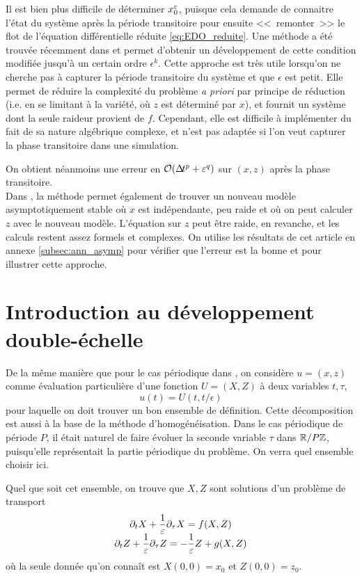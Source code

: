 Il est bien plus difficile de déterminer $x_0^{\varepsilon}$, puisque cela demande de connaitre l'état du système après la période transitoire pour ensuite <<~remonter~>> le flot de l'équation différentielle réduite \eqref{eq:EDO_reduite}. 
Une méthode a été trouvée récemment dans \cite{castella2016formal} et permet d'obtenir un développement de cette condition modifiée jusqu'à un certain ordre $\epsilon^k$. 
Cette approche est très utile lorsqu'on ne cherche pas à capturer la période transitoire du système et que $\epsilon$ est petit. Elle permet de réduire la complexité du problème \textit{a priori} par principe de réduction (i.e. en se limitant à la variété, où $z$ est déterminé par $x$), et fournit un système dont la seule raideur provient de $f$. Cependant, elle est difficile à implémenter du fait de sa nature algébrique complexe, et n'est pas adaptée si l'on veut capturer la phase transitoire dans une simulation. 

On obtient néanmoins une erreur en $\mathcal{O}(\Delta\!\!\!\ t^p + \varepsilon^q)$ sur $(x,z)$ après la phase transitoire. \\

Dans \cite{castella2016formal}, la méthode permet également de trouver un nouveau modèle asymptotiquement stable où $x$ est indépendante, peu raide et où on peut calculer $z$ avec le nouveau modèle. 
L'équation sur $z$ peut être raide, en revanche, et les calculs restent assez formels et complexes.
On utilise les résultats de cet article en annexe \ref{subsec:ann_asymp} pour vérifier que l'erreur est la bonne et pour illustrer cette approche. 



\section{Introduction au développement double-échelle}


De la même manière que pour le cas périodique dans \cite{chartier2015UA}, on considère $u = (x,z)$ comme évaluation particulière d'une fonction $U = (X,Z)$ à deux variables $t,\tau$, 
$$ u(t) = U(t,t/\epsilon) $$
pour laquelle on doit trouver un bon ensemble de définition. 
Cette décomposition est aussi à la base de la méthode d'homogénéisation. 
Dans le cas périodique de période $P$, il était naturel de faire évoluer la seconde variable $\tau$ dans $\mathbb{R}/P\mathbb{Z}$, puisqu'elle représentait la partie périodique du problème. 
On verra quel ensemble choisir ici. 

Quel que soit cet ensemble, on trouve que $X,Z$ sont solutions d'un problème de transport 
\begin{equation} \label{eq:trsp_XZ}
\begin{array}{c} \displaystyle
\partial_t X + \frac{1}{\varepsilon} \partial_{\tau} X = f(X,Z) 
\\ \displaystyle
\partial_t Z + \frac{1}{\varepsilon} \partial_{\tau} Z = -\frac{1}{\varepsilon} Z + g(X,Z)
\end{array}
\end{equation}
où la seule donnée qu'on connaît est $X(0,0) = x_0$ et $Z(0,0) = z_0$. \\

